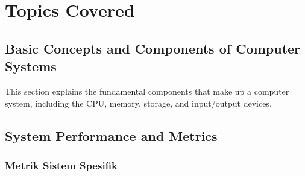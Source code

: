 \documentclass[12pt]{article}
\begin{document}
\section{Topics Covered}

\subsection{Basic Concepts and Components of Computer Systems}
This section explains the fundamental components that make up a computer system, including the CPU, memory, storage, and input/output devices.

\subsection{System Performance and Metrics}
\subsubsection{Metrik Sistem Spesifik}
\end{document}
